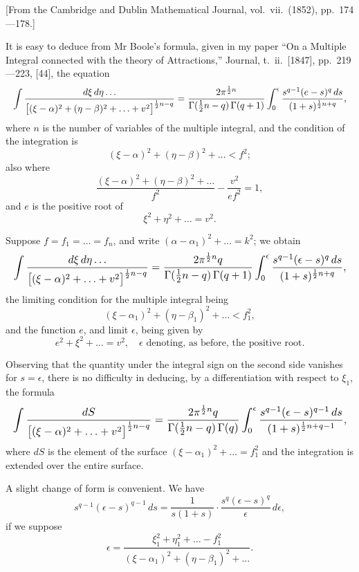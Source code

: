 \documentclass[11pt,a4paper]{article}
\theoremstyle{plain}
\begin{document}
[From the Cambridge and Dublin Mathematical Journal, vol.\ vii.\ (1852), pp.\ 174---178.]

\bigskip

It is easy to deduce from Mr Boole's formula, given in my paper ``On a Multiple Integral connected with the theory of Attractions,'' Journal, t.\ ii.\ [1847], pp.\ 219---223, [44], the equation
\[
\resizebox{\textwidth}{!}{$\displaystyle \int \frac{d\xi \, d\eta\ldots}{\bigl[(\xi-\alpha)^2 + (\eta-\beta)^2 + \ldots + v^2\bigr]^{\frac{1}{2}n-q}} = \frac{2\pi^{\frac{1}{2}n}}{\Gamma(\tfrac{1}{2}n-q)\,\Gamma(q+1)} \int_0^{\epsilon} \frac{s^{q-1}(e-s)^q\,ds}{(1+s)^{\frac{1}{2}n+q}}, $}
\]
where $n$ is the number of variables of the multiple integral, and the condition of the integration is
\[(\xi-\alpha)^2 + (\eta-\beta)^2 + \ldots < f^2;\]
also where
\[\frac{(\xi-\alpha)^2 + (\eta-\beta)^2 + \ldots}{f^2} - \frac{v^2}{e f^2} = 1,\]
and $e$ is the positive root of
\[\xi^2 + \eta^2 + \ldots = v^2.\]

Suppose $f = f_1 = \ldots = f_n$, and write $(\alpha-\alpha_1)^2 + \ldots = k^2$; we obtain
\[
\resizebox{\textwidth}{!}{$\displaystyle \int \frac{d\xi \, d\eta\ldots}{\bigl[(\xi-\alpha)^2 + \ldots + v^2\bigr]^{\frac{1}{2}n-q}} = \frac{2\pi^{\frac{1}{2}n} q}{\Gamma(\tfrac{1}{2}n-q)\,\Gamma(q+1)} \int_0^{\epsilon} \frac{s^{q-1}(\epsilon-s)^q\,ds}{(1+s)^{\frac{1}{2}n+q}}, $}
\]
the limiting condition for the multiple integral being
\[(\xi-\alpha_1)^2 + (\eta-\beta_1)^2 + \ldots < f_1^2,\]
and the function $e$, and limit $\epsilon$, being given by
\[e^2 + \xi^2 + \ldots = v^2, \quad \epsilon \text{ denoting, as before, the positive root.}\]

Observing that the quantity under the integral sign on the second side vanishes for $s = \epsilon$, there is no difficulty in deducing, by a differentiation with respect to $\xi_1$, the formula
\[
\resizebox{\textwidth}{!}{$\displaystyle \int \frac{dS}{\bigl[(\xi-\alpha)^2 + \ldots + v^2\bigr]^{\frac{1}{2}n-q}} = \frac{2\pi^{\frac{1}{2}n} q}{\Gamma(\tfrac{1}{2}n-q)\,\Gamma(q)} \int_0^{\epsilon} \frac{s^{q-1}(\epsilon-s)^{q-1}\,ds}{(1+s)^{\frac{1}{2}n+q-1}}, $}
\]
where $dS$ is the element of the surface $(\xi-\alpha_1)^2 + \ldots = f_1^2$ and the integration is extended over the entire surface.

A slight change of form is convenient. We have
\[s^{q-1}(\epsilon-s)^{q-1}\,ds = \frac{1}{s(1+s)}\cdot\frac{s^q(\epsilon-s)^q}{\epsilon}\,d\epsilon,\]
if we suppose
\[\epsilon = \frac{\xi_1^2 + \eta_1^2 + \ldots - f_1^2}{(\xi-\alpha_1)^2 + (\eta-\beta_1)^2 + \ldots}.\]
\end{document}
